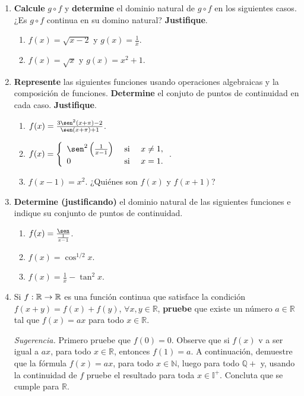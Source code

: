\documentclass[12pt]{article}
\begin{document}
\begin{enumerate}
    \item \textbf{Calcule} $g\circ f$ y \textbf{determine} el dominio natural de $g\circ f$ en los siguientes casos. ¿Es $g\circ f$ continua en su domino natural? \textbf{Justifique}.
    \begin{enumerate}
        \item $f(x)=\sqrt{x-2}$ y $g(x)=\frac{1}{x}$.
        \item $f(x)=\sqrt{x}$ y $g(x)=x^2+1$.
    \end{enumerate}

    \item \textbf{Represente} las siguientes funciones usando operaciones algebraicas y la composición de funciones. \textbf{Determine} el conjuto de puntos de continuidad en cada caso. \textbf{Justifique}.
    \begin{enumerate}
        \item $f(x)=\frac{3\sen^2(x+\pi)-2}{\sen(x+\pi)+1}$.
        \item $f(x)=\left\{
            \begin{array}{lcr}
                \sen^2\left(\frac{1}{x-1} \right) & \textup{ si } & x\neq 1,\\
                0 & \textup{ si } & x = 1.\\
            \end{array}
        \right.$.
        \item $f(x-1)=x^2$. ¿Quiénes son $f(x)$ y $f(x+1)$?
    \end{enumerate}
    
    \item  \textbf{Determine (justificando)} el dominio natural de las siguientes funciones e indique su conjunto de puntos de continuidad.
    \begin{enumerate}
        \item $f(x)=\frac{\sen}{\frac{1}{x-1}}$.
        \item $f(x)=\cos^{1/2}x$.
        \item $f(x)=\frac{1}{x}-\tan^2x$.
    \end{enumerate}

    \item Si $f:\mathbb{R}\rightarrow\mathbb{R}$ es una función continua que satisface la condición $f(x+y)=f(x)+f(y)$, $\forall x,y\in\mathbb{R}$, \textbf{pruebe} que existe un número $a\in\mathbb{R}$ tal que $f(x)=ax$ para todo $x\in\mathbb{R}$.

    \textit{Sugerencia.} Primero pruebe que $f(0)=0$. Observe que si $f(x)$ v a ser igual a $ax$, para todo $x\in\mathbb{R}$, entonces $f(1)=a$. A continuación, demuestre que la fórmula $f(x)=ax$, para todo $x\in\mathbb{N}$, luego para todo $\mathbb{Q}+$ y, usando la continuidad de $f$ pruebe el resultado para toda $x\in\mathbb{I}^+$. Concluta que se cumple para $\mathbb{R}$.


\end{enumerate}
\end{document}
